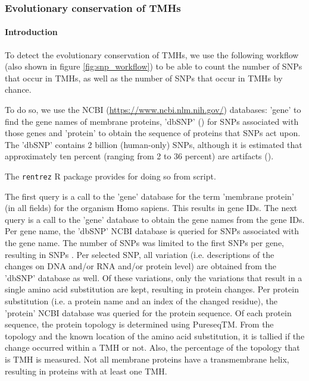 \subsubsection{Evolutionary conservation of TMHs}

\paragraph{Introduction}

To detect the evolutionary conservation of TMHs, 
we use the following workflow (also shown
in figure \ref{fig:snp_workflow}) to be able to count the
number of SNPs that occur in TMHs, as well as the number of SNPs
that occur in TMHs by chance.

To do so, we use the 
NCBI (\url{https://www.ncbi.nlm.nih.gov/}) databases:
'gene' to find the gene names of membrane proteins, 
'dbSNP' (\cite{sherry2001dbsnp}) for SNPs associated with those genes
and 'protein' to obtain the sequence of proteins that SNPs act upon.
The 'dbSNP' contains 2 billion (human-only) SNPs, although
it is estimated that approximately ten percent (ranging from 2 to 36 percent) 
are artifacts (\cite{carlson2003additional, cutler2001high, gabriel2002structure, mitchell2004discrepancies, musumeci2010single, reich2003quality}).


The \verb;rentrez; R package provides for doing so from script.

The first query is a call to the 'gene' database for the 
term 'membrane protein' (in all fields) for the organism Homo sapiens.
This results in  gene IDs.
The next query is a call to the 'gene' database 
to obtain the gene names from the gene IDs.
Per gene name, the 'dbSNP' NCBI database is queried for 
SNPs associated with the gene name. The number of SNPs
was limited to the first  SNPs per gene,
resulting in  SNPs 
.
Per selected SNP, all variation (i.e. descriptions of the changes on DNA
and/or RNA and/or protein level) are obtained from the 'dbSNP' database
as well. Of these variations, only the variations that result in a single
amino acid substitution are kept, resulting in  protein changes.
Per protein substitution (i.e. a protein name and an index of the changed residue), 
the 'protein' NCBI database was queried for the
protein sequence.
Of each protein sequence, the protein topology is determined 
using PureseqTM.
From the topology and the known location of the amino acid substitution, 
it is tallied if the change occurred within a TMH or not.
Also, the percentage of the topology that is TMH is measured.
Not all membrane proteins have a transmembrane helix, resulting
in  proteins with at least one TMH. 


